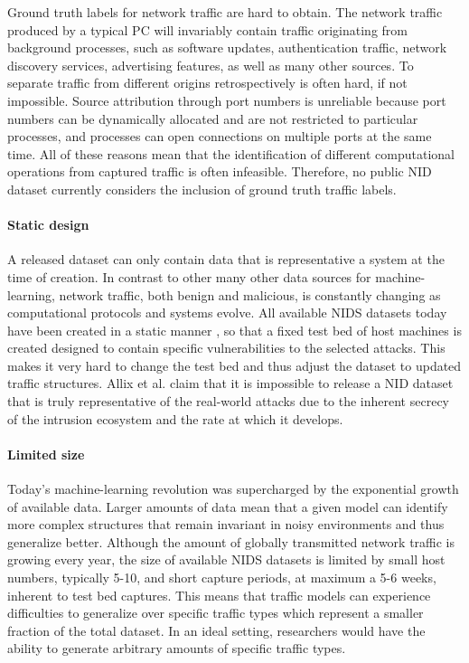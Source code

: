 Ground truth labels for network traffic are hard to obtain. The network traffic produced by a typical PC will invariably contain traffic originating from background processes, such as software updates, authentication traffic, network discovery services, advertising features, as well as many other sources. To separate traffic from different origins retrospectively is often hard, if not impossible. Source attribution through port numbers is unreliable because port numbers can be dynamically allocated and are not restricted to particular processes, and processes can open connections on multiple ports at the same time. 
All of these reasons mean that the identification of different computational operations from captured traffic is often infeasible. 
Therefore, no public NID dataset currently considers the inclusion of ground truth traffic labels.

\paragraph*{Static design}

A released dataset can only contain data that is representative a system at the time of creation. In contrast to other many other data sources for machine-learning, network traffic, both benign and malicious, is constantly changing as computational protocols and systems evolve. All available NIDS datasets today have been created in a static manner , so that a fixed test bed of host machines is created designed to contain specific vulnerabilities to the selected attacks. This makes it very hard to change the test bed and thus adjust the dataset to updated traffic structures. Allix et al. \cite{allix2014machine} claim that it is impossible to release a NID dataset that is truly representative of the real-world attacks due to the inherent secrecy of the intrusion ecosystem and the rate at which it develops.


\paragraph*{Limited size}
Today's machine-learning revolution was supercharged by the exponential growth of available data. Larger amounts of data mean that a given model can identify more complex structures that remain invariant in noisy environments and thus generalize better. Although the amount of globally transmitted network traffic is growing every year, the size of available NIDS datasets is limited by small host numbers, typically 5-10, and short capture periods, at maximum a 5-6 weeks, inherent to test bed captures. This means that traffic models can experience difficulties to generalize over specific traffic types which represent a smaller fraction of the total dataset. In an ideal setting, researchers would have the ability to generate arbitrary amounts of specific traffic types.


